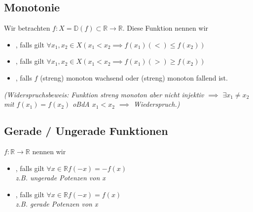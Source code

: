 \subsection{Monotonie}
Wir betrachten $f: X = \mathbb{D}(f) \subset \mathbb{R} \rightarrow \mathbb{R}$. Diese Funktion nennen wir
\begin{itemize}
    \item {}, falls gilt $\forall x_1, x_2 \in X (x_1 < x_2 \implies f(x_1) (<) \leq f(x_2))$
    \item {}, falls gilt $\forall x_1, x_2 \in X (x_1 < x_2 \implies f(x_1) (>) \geq f(x_2))$
    \item {}, falls $f$ (streng) monoton wachsend oder (streng) monoton fallend ist.
\end{itemize}

\textit{(Widerspruchsbeweis: Funktion streng monoton aber nicht injektiv $\implies$ $\exists x_1 \neq x_2$ mit $f(x_1) = f(x_2)$ oBdA $x_1 < x_2$ $\implies$ Wiederspruch.)}


\subsection{Gerade / Ungerade Funktionen}
$f:\mathbb{R}\rightarrow \mathbb{R}$ nennen wir
\begin{itemize}
    \item {}, falls gilt $\forall x \in \mathbb{R} f(-x) = -f(x)$\\
    \textit{z.B. ungerade Potenzen von x}
    \item {}, falls gilt $\forall x \in \mathbb{R} f(-x) = f(x)$\\
    \textit{z.B. gerade Potenzen von x}
\end{itemize}

